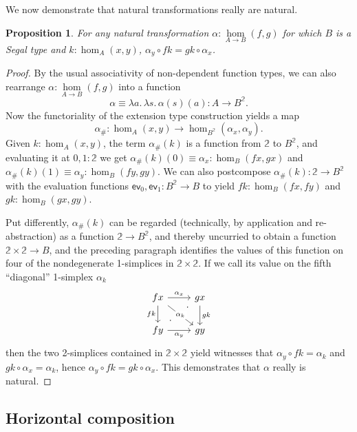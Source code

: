 \documentclass{amsart}
\theoremstyle{plain}
\newtheorem{prop}[thm]{Proposition}
\theoremstyle{definition}
\theoremstyle{remark}
\numberwithin{equation}{section}
\newcommand{\extfn}[1]{{#1}_\#}
\newcommand{\jdeq}{\equiv}
\def\nat#1#2{\underset{#1\to#2}{\hom}}
\newcommand{\lam}[1]{\lambda #1.\,}
\newcommand{\extapp}[2]{{#1}({#2})}
\newcommand{\two}{\mathbb{2}}
\begin{document}
We now demonstrate that natural transformations really are natural.

\begin{prop}\label{prop:nat-are-nat} For any natural transformation $\alpha : \nat AB(f,g)$ for which $B$ is a Segal type and $k : \hom_A(x,y)$, $\alpha_y \circ fk = gk \circ \alpha_x$. 
\end{prop}
\begin{proof}
By the usual associativity of non-dependent function types, we can also rearrange $\alpha : \nat AB(f,g)$ into a function
\[ \alpha \jdeq \lam{a}\lam{s}\extapp{\alpha}{s}(a) : A \to B^\two.\]
Now the functoriality of the extension type construction yields a map
\[ \extfn\alpha : \hom_A(x,y) \to \hom_{B^\two}(\alpha_x,\alpha_y).\]
Given $k :\hom_A(x,y)$, the term $\extfn\alpha(k)$ is a function from $\two$ to $B^\two$, and evaluating it at $0,1:\two$ we get $\extfn\alpha(k)(0) \jdeq \alpha_x : \hom_{B}(fx,gx)$ and $\extfn\alpha(k)(1)\jdeq\alpha_y : \hom_{B}(fy,gy)$.
We can also postcompose $\extfn\alpha(k) : \two \to B^\two$ with the evaluation functions $\mathsf{ev}_0, \mathsf{ev}_1 : B^\two \to B$ to yield $fk : \hom_{B}(fx,fy)$ and $gk : \hom_{B}(gx,gy)$.

Put differently, $\extfn\alpha(k)$ can be regarded (technically, by application and re-ab\-stract\-ion) as a function $\two \to B^\two$, and thereby uncurried to obtain a function $\two\times \two \to B$, and the preceding paragraph identifies the values of this function on four of the nondegenerate 1-simplices in $\two\times\two$.
If we call its value on the fifth ``diagonal'' 1-simplex $\alpha_k$
\[
\begin{tikzcd}
fx \arrow[r, "\alpha_x"] \arrow[dr, "\alpha_k" description] \arrow[d, "fk"'] & gx \arrow[d, "gk"] \\ fy \arrow[r, "\alpha_y"']  \arrow[ur, phantom, "\cdot" very near start, "\cdot" very near end] & gy
\end{tikzcd}
\]
then the two 2-simplices contained in $\two\times\two$ yield witnesses that $\alpha_y \circ fk = \alpha_k$ and $gk \circ \alpha_x = \alpha_k$, hence $\alpha_y \circ fk = gk \circ \alpha_x$. This demonstrates that $\alpha$ really is natural.
\end{proof}

\subsection{Horizontal composition}
\label{sec:horiz}
\end{document}
